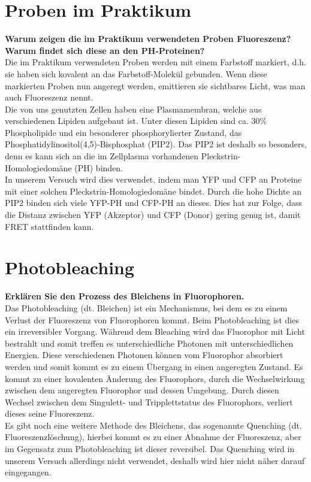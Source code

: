 \section{Proben im Praktikum}
\textbf{Warum zeigen die im Praktikum verwendeten Proben Fluoreszenz? Warum findet sich diese an
den PH-Proteinen?}\\
Die im Praktikum verwendeten Proben werden mit einem Farbstoff markiert, d.h.
sie haben sich kovalent an das Farbstoff-Molekül gebunden. Wenn diese 
markierten Proben nun angeregt werden, emittieren sie sichtbares Licht, was man auch Fluoreszenz nennt.\\
Die von uns genutzten Zellen haben eine Plasmamembran, welche aus verschiedenen Lipiden aufgebaut ist. 
Unter diesen Lipiden sind ca. 30\% Phospholipide und ein besonderer phosphorylierter Zustand, das Phosphatidylinositol(4,5)-Bisphosphat (PIP2). 
Das PIP2 ist deshalb so besonders, denn es kann sich an die 
im Zellplasma vorhandenen Pleckstrin-Homologiedomäne (PH) binden.\\
In unserem Versuch wird dies verwendet, indem man YFP und CFP an Proteine mit einer solchen Pleckstrin-Homologiedomäne bindet. 
Durch die hohe Dichte an PIP2 binden sich viele YFP-PH und CFP-PH an dieses. Dies hat zur Folge, dass die Distanz 
zwischen YFP (Akzeptor) und CFP (Donor) gering genug ist, damit FRET stattfinden kann.
\citep[vgl.][]{Anleitung}

\section{Photobleaching}
\textbf{Erklären Sie den Prozess des Bleichens in Fluorophoren.}\\
Das Photobleaching (dt. Bleichen) ist ein Mechanismus, bei dem es zu
einem Verlust der Fluoreszenz von Fluorophoren kommt. 
Beim Photobleaching ist dies ein irreversibler Vorgang.
Während dem Bleaching wird das Fluorophor mit Licht bestrahlt und somit treffen es 
unterschiedliche Photonen mit unterschiedlichen Energien. 
Diese verschiedenen Photonen können vom Fluorophor absorbiert werden und somit kommt 
es zu einem Übergang in einen angeregten Zustand. 
Es kommt zu einer kovalenten Änderung des Fluorophors, durch die Wechselwirkung 
zwischen dem angeregten Fluorophor und dessen Umgebung. 
Durch diesen Wechsel zwischen dem Singulett- und Tripplettstatus des Fluorophors, 
verliert dieses seine Fluoreszenz.\\
Es gibt noch eine weitere Methode des Bleichens, das sogenannte Quenching 
(dt. Fluoreszenzlöschung), hierbei kommt es zu einer Abnahme der Fluoreszenz, aber 
im Gegensatz zum Photobleaching ist dieser reversibel. Das Quenching wird 
in unserem Versuch allerdings nicht verwendet, deshalb wird hier nicht näher darauf
eingegangen. 
\citep[vgl.][]{photobleaching}
